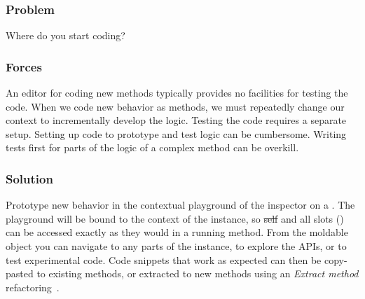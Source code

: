 \documentclass[sigconf]{acmart}
\renewcommand{\nbc}[3]{} %
\newcommand\tg[1]{\nbc{TG}{#1}{blue}}
\newcommand\eog[1]{\nbc{Edward}{#1}{purple}}
\newcommand{\pattern}[1]{\emph{\nameref{pat:#1}}\xspace}
\begin{document}

\eog{So you're exploring maybe we could talk about what, what exploring means.
Like if you ask a regular developer, like tell me about the explorations you've done this morning, versus, hey, what kind of like debugging or like learning about the system?}

\subsubsection*{Problem}
Where do you start coding?

\subsubsection*{Forces}
An editor for coding new methods typically provides no facilities for testing the code.
When we code new behavior as methods, we must repeatedly change our context to incrementally develop the logic.
Testing the code requires a separate setup.
Setting up code to prototype and test logic can be cumbersome.
Writing tests first for parts of the logic of a complex method can be overkill.

\subsubsection*{Solution}
Prototype new behavior in the contextual playground of the inspector on a \pattern{moldableObject}.
The playground will be bound to the context of the instance, so \st{self} and all slots (\ie {}) can be accessed exactly as they would in a running method.
From the moldable object you can navigate to any parts of the instance, to explore the APIs, or to test experimental code.
Code snippets that work as expected can then be copy-pasted to existing methods, or extracted to new methods using an \emph{Extract method} refactoring~\cite{Fowl99a}.

\end{document}
